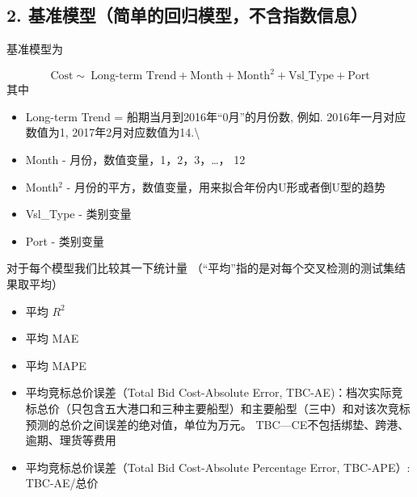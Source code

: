 \documentclass[]{article}
\begin{document}
\subsection{2. 基准模型（简单的回归模型，不含指数信息）}

基准模型为

\[\text{Cost} \sim~ \text{Long-term Trend} + \text{Month} + \text{Month}^2 + \text{Vsl_Type} + \text{Port}\]
其中

\begin{itemize}
\item
  Long-term Trend = 船期当月到2016年``0月''的月份数, 例如.
  2016年一月对应数值为1, 2017年2月对应数值为14.\textbackslash{}
\item
  Month - 月份，数值变量，1，2，3，\ldots{}， 12
\item
  Month\(^2\) - 月份的平方，数值变量，用来拟合年份内U形或者倒U型的趋势
\item
  Vsl\_Type - 类别变量
\item
  Port - 类别变量
\end{itemize}

对于每个模型我们比较其一下统计量
（``平均''指的是对每个交叉检测的测试集结果取平均）

\begin{itemize}
\item
  平均 \(R^2\)
\item
  平均 MAE
\item
  平均 MAPE
\item
  平均竞标总价误差（Total Bid Cost-Absolute Error,
  TBC-AE)：档次实际竞标总价（只包含五大港口和三种主要船型）和主要船型（三中）和对该次竞标预测的总价之间误差的绝对值，单位为万元。
  TBC---CE不包括绑垫、跨港、逾期、理货等费用
\item
  平均竞标总价误差（Total Bid Cost-Absolute Percentage Error, TBC-APE）:
  TBC-AE/总价
\end{itemize}
\end{document}
